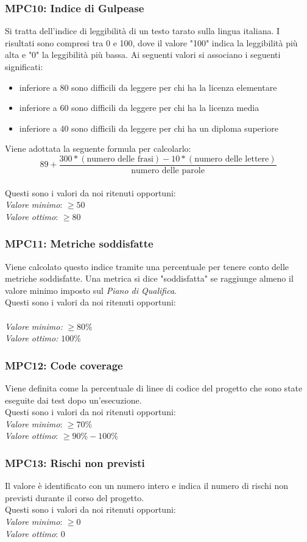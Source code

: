 \subsubsection{MPC10: Indice di Gulpease}
Si tratta dell'indice di leggibilità di un testo tarato sulla lingua italiana.
I risultati sono compresi tra 0 e 100, dove il valore "100" indica la leggibilità più alta e "0" la leggibilità più bassa. Ai seguenti valori si associano i seguenti significati:
\begin{itemize}
\item inferiore a 80 sono difficili da leggere per chi ha la licenza elementare
\item inferiore a 60 sono difficili da leggere per chi ha la licenza media
\item inferiore a 40 sono difficili da leggere per chi ha un diploma superiore
\end{itemize}
Viene adottata la seguente formula per calcolarlo:
\begin{equation*}
89+\frac{300*(\text{numero delle frasi})-10*(\text{numero delle lettere})}{\text{numero delle parole}}
\end{equation*}\\
Questi sono i valori da noi ritenuti opportuni:\\
\textit{Valore minimo}: $ \ge 50 $\\ 
\textit{Valore ottimo}: $ \ge 80 $\\

\subsubsection{MPC11: Metriche soddisfatte}
Viene calcolato questo indice tramite una percentuale per tenere conto delle metriche soddisfatte. Una metrica si dice "soddisfatta" se raggiunge almeno il valore minimo imposto sul \textit{\textit{Piano di Qualifica}}.\\
Questi sono i valori da noi ritenuti opportuni:\\\\
\textit{Valore minimo:} $ \ge 80\% $\\
\textit{Valore ottimo:} $ 100\% $\\

\subsubsection{MPC12: Code coverage}
Viene definita come la percentuale di linee di codice del progetto che sono state eseguite dai test dopo un'esecuzione.\\
Questi sono i valori da noi ritenuti opportuni:\\
\textit{Valore minimo}: $ \ge 70\% $\\
\textit{Valore ottimo}: $ \ge 90\% - 100\% $\\

\subsubsection{MPC13: Rischi non previsti}
Il valore è identificato con un numero intero e indica il numero di rischi non previsti durante il corso del progetto.\\
Questi sono i valori da noi ritenuti opportuni:\\
\textit{Valore minimo}: $ \ge 0$\\
\textit{Valore ottimo}: 0\\